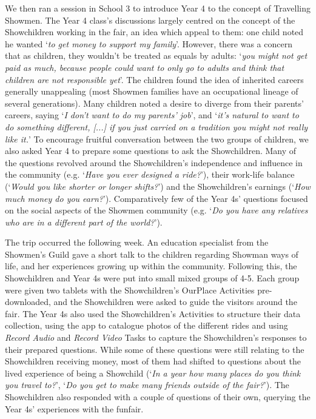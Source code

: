 \documentclass[,hyphens]{sigchi}
\begin{document}
We then ran a session in School 3 to introduce Year 4 to the concept of Travelling Showmen. The Year 4 class's discussions largely centred on the concept of the Showchildren working in the fair, an idea which appeal to them: one child noted he wanted `\textit{to get money to support my family}'. However, there was a concern that as children, they wouldn't be treated as equals by adults: `\textit{you might not get paid as much, because people could want to only go to adults and think that children are not responsible yet}'. The children found the idea of inherited careers generally unappealing (most Showmen families have an occupational lineage of several generations). Many children noted a desire to diverge from their parents' careers, saying `\textit{I don't want to do my parents' job}', and `\textit{it's natural to want to do something different, [...] if you just carried on a tradition you might not really like it.}' To encourage fruitful conversation between the two groups of children, we also asked Year 4 to prepare some questions to ask the Showchildren. Many of the questions revolved around the Showchildren's independence and influence in the community (e.g. `\textit{Have you ever designed a ride?}'), their work-life balance (`\textit{Would you like shorter or longer shifts?}') and the Showchildren's earnings (`\textit{How much money do you earn?}'). Comparatively few of the Year 4s' questions focused on the social aspects of the Showmen community (e.g. `\textit{Do you have any relatives who are in a different part of the world?}').

The trip occurred the following week. An education specialist from the Showmen's Guild gave a short talk to the children regarding Showman ways of life, and her experiences growing up within the community. Following this, the Showchildren and Year 4s were put into small mixed groups of 4-5. Each group were given two tablets with the Showchildren's OurPlace Activities pre-downloaded, and the Showchildren were asked to guide the visitors around the fair. The Year 4s also used the Showchildren's Activities to structure their data collection, using the app to catalogue photos of the different rides and using \textit{Record Audio} and \textit{Record Video} Tasks to capture the Showchildren's responses to their prepared questions. While some of these questions were still relating to the Showchildren receiving money, most of them had shifted to questions about the lived experience of being a Showchild (`\textit{In a year how many places do you think you travel to?}', `\textit{Do you get to make many friends outside of the fair?}'). The Showchildren also responded with a couple of questions of their own, querying the Year 4s' experiences with the funfair.
\end{document}
